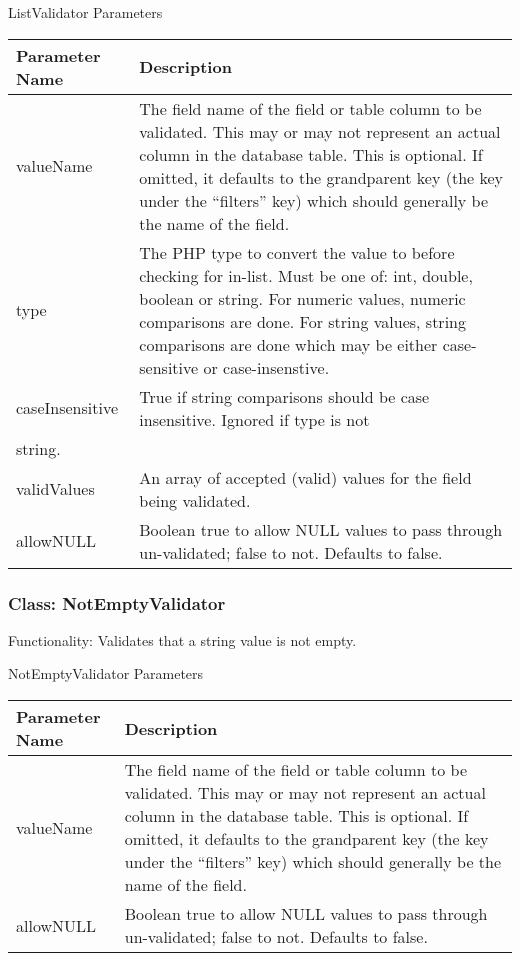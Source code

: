 \documentclass[letterpaper,10pt,english]{sphinxmanual}
\begin{document}
ListValidator Parameters

\begin{tabulary}{\linewidth}{|L|L|}
\hline
\textbf{
Parameter Name
} & \textbf{
Description
}\\\hline

valueName
 & 
The field name of the field or table column to be validated.  This may or may not
represent an actual column in the database table.  This is optional.  If omitted, it
defaults to the grandparent key (the key under the ``filters'' key) which should
generally be the name of the field.
\\\hline

type
 & 
The PHP type to convert the value to before checking for in-list.  Must be one of:
int, double, boolean or string.  For numeric values, numeric comparisons are done.
For string values, string comparisons are done which may be either case-sensitive or
case-insenstive.
\\\hline

caseInsensitive
 & 
True if string comparisons should be case insensitive.  Ignored if type is not
\\\hline

string.
 & \\\hline

validValues
 & 
An array of accepted (valid) values for the field being validated.
\\\hline

allowNULL
 & 
Boolean true to allow NULL values to pass through un-validated; false to not.
Defaults to false.
\\\hline
\end{tabulary}



\subsubsection{Class: NotEmptyValidator}
\label{jaxFrameworkGuide:class-notemptyvalidator}
Functionality: Validates that a string value is not empty.

NotEmptyValidator Parameters

\begin{tabulary}{\linewidth}{|L|L|}
\hline
\textbf{
Parameter Name
} & \textbf{
Description
}\\\hline

valueName
 & 
The field name of the field or table column to be validated.  This may or may not
represent an actual column in the database table.  This is optional.  If omitted, it
defaults to the grandparent key (the key under the ``filters'' key) which should
generally be the name of the field.
\\\hline

allowNULL
 & 
Boolean true to allow NULL values to pass through un-validated; false to not.
Defaults to false.
\\\hline
\end{tabulary}
\end{document}
